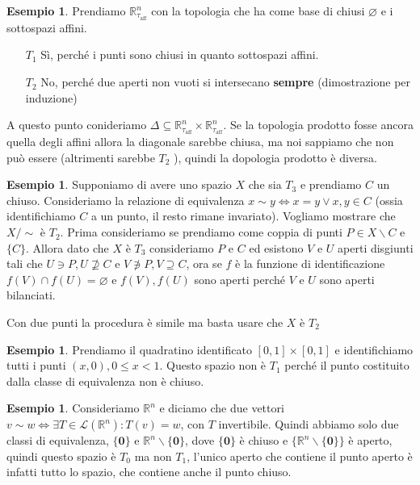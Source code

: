 \documentclass{article}
\newcounter{theo}[section]\setcounter{theo}{0}
\newcounter{excounter}[section]\setcounter{excounter}{0}
\theoremstyle{plain}
\theoremstyle{definition}
\newtheorem{example}[excounter]{Esempio}
\theoremstyle{remark}
\begin{document}
\begin{example}
    Prendiamo \(\mathbb{R}^{n}_{\tau_\text{aff} }\) con la topologia che ha come base di chiusi
    \(\varnothing\) e i sottospazi affini.
\begin{enumerate}[label = \arabic*.]
    \item[\(T_{1}\) ] Sì, perché i punti sono chiusi in quanto sottospazi
        affini.
    \item[\(T_{2}\) ] No, perché due aperti non vuoti si intersecano
        \textbf{sempre} (dimostrazione per induzione)
\end{enumerate}
A questo punto conideriamo \(\Delta \subseteq \mathbb{R}^{n}_{\tau_\text{aff} }
\times \mathbb{R}^{n}_{\tau_\text{aff}  }\). Se la topologia prodotto fosse
ancora quella degli affini allora la diagonale sarebbe chiusa, ma noi sappiamo
che non può essere (altrimenti sarebbe \(T_{2}\) ), quindi la dopologia prodotto è diversa.
\end{example}

\begin{example}
    Supponiamo di avere uno spazio \(X\) che sia \(T_{3}\) e prendiamo \(C\) un
    chiuso. Consideriamo la relazione di equivalenza \(x \sim y \iff x = y \lor
    x, y \in C\) (ossia identifichiamo \(C\) a un punto, il resto rimane
    invariato).
    Vogliamo mostrare che \(X / \sim \) è \(T_{2}\).
    Prima consideriamo se prendiamo come coppia di punti \(P \in X
    \smallsetminus C\) e \(\{C\} \). Allora dato che \(X\) è \(T_{3}\)
    consideriamo \(P\) e \(C\) ed esistono \(V\) e \(U\) aperti disgiunti tali che \(U \ni P, U
    \not\supseteq C \) e \(V \not\ni P, V \supseteq C\), ora se \(f\) è la
    funzione di identificazione \(f(V) \cap f(U) = \varnothing\) e \(f(V),
    f(U)\) sono aperti perché \(V\) e \(U\) sono aperti bilanciati.

    Con due punti la procedura è simile ma basta usare che \(X\) è \(T_{2}\) 
\end{example}

\begin{example}
    Prendiamo il quadratino identificato \([0, 1] \times [0, 1]\) e
    identifichiamo tutti i punti \((x, 0), 0 \le x < 1\). Questo spazio non è
    \(T_{1}\) perché il punto costituito dalla classe di equivalenza non è
    chiuso.
\end{example}

\begin{example}
    Consideriamo \(\mathbb{R}^{n}\) e diciamo che due vettori \(v \sim w \iff
\exists T \in \mathcal{L}(\mathbb{R}^{n}) : T(v) = w\), con \(T\) invertibile.
    Quindi abbiamo solo due classi di equivalenza, \(\{\mathbf{0}\} \) e
    \(\mathbb{R}^{n} \smallsetminus \{\mathbf{0}\} \), dove \(\{\mathbf{0}\}\) è chiuso
    e \(\{\mathbb{R}^{n} \smallsetminus \{\mathbf{0}\}\} \) è aperto, quindi
    questo spazio è \(T_{0}\) ma non \(T_{1}\), l'unico aperto che contiene il
    punto aperto è infatti tutto lo spazio, che contiene anche il punto chiuso.
\end{example}
\end{document}
